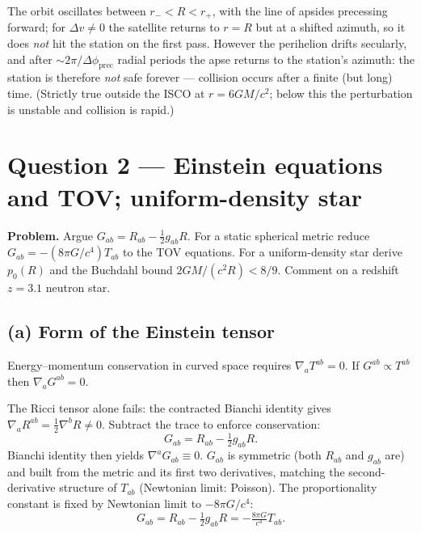\documentclass[11pt]{article}
\begin{document}
\begin{center}
\end{center}

The orbit oscillates between $r_-<R<r_+$, with the line of apsides precessing forward; for $\Delta v\ne 0$ the satellite returns to $r=R$ but at a shifted azimuth, so it does \emph{not} hit the station on the first pass. However the perihelion drifts secularly, and after $\sim 2\pi/\Delta\phi_\text{prec}$ radial periods the apse returns to the station's azimuth: the station is therefore \emph{not} safe forever --- collision occurs after a finite (but long) time. (Strictly true outside the ISCO at $r = 6GM/c^2$; below this the perturbation is unstable and collision is rapid.)

\section*{Question 2 --- Einstein equations and TOV; uniform-density star}

\textbf{Problem.} Argue $G_{ab} = R_{ab}-\tfrac12 g_{ab}R$. For a static spherical metric reduce $G_{ab}=-(8\pi G/c^4)T_{ab}$ to the TOV equations. For a uniform-density star derive $p_0(R)$ and the Buchdahl bound $2GM/(c^2 R) < 8/9$. Comment on a redshift $z=3.1$ neutron star.

\subsection*{(a) Form of the Einstein tensor}

Energy--momentum conservation in curved space requires $\nabla_a T^{ab} = 0$. If $G^{ab}\propto T^{ab}$ then $\nabla_a G^{ab} = 0$.

The Ricci tensor alone fails: the contracted Bianchi identity gives $\nabla_a R^{ab} = \tfrac12\nabla^b R\ne 0$. Subtract the trace to enforce conservation:
\[
G_{ab} = R_{ab} - \tfrac12 g_{ab} R.
\]
Bianchi identity then yields $\nabla^a G_{ab} \equiv 0$. $G_{ab}$ is symmetric (both $R_{ab}$ and $g_{ab}$ are) and built from the metric and its first two derivatives, matching the second-derivative structure of $T_{ab}$ (Newtonian limit: Poisson). The proportionality constant is fixed by Newtonian limit to $-8\pi G/c^4$:
\[
\boxed{\;G_{ab} = R_{ab}-\tfrac12 g_{ab}R = -\tfrac{8\pi G}{c^4}T_{ab}.\;}
\]
\end{document}
